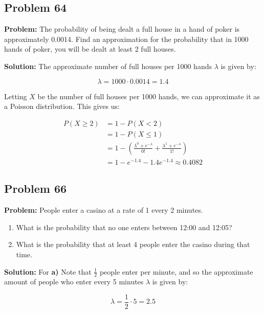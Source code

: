 \documentclass{article}
\begin{document}
\subsection*{Problem 64}
\noindent\textbf{Problem:} The probability of being dealt a full house in a hand of poker is approximately 0.0014. Find an approximation for the probability that in 1000 hands of poker, you will be dealt at least 2 full houses.
\bigskip

\noindent\textbf{Solution:} The approximate number of full houses per 1000 hands $\lambda$ is given by:

\begin{equation*}
    \lambda = 1000\cdot0.0014 = 1.4
\end{equation*}

Letting $X$ be the number of full houses per 1000 hands, we can approximate it as a Poisson distribution. This gives us:

\begin{align*}
    P(X\ge2)&=1-P(X<2)\tag{complement of inequality}\\
    &=1-P(X\le 1)\tag{discrete random variable}\\
    &=1-\left(\frac{\lambda^0+e^{-\lambda}}{0!}+\frac{\lambda^1+e^{-\lambda}}{1!}\right)\tag{Poisson distribution}\\
    &=1-e^{-1.4}-1.4e^{-1.4}\approx0.4082
\end{align*}

\subsection*{Problem 66}
\noindent\textbf{Problem:} People enter a casino at a rate of 1 every 2 minutes.
\begin{enumerate}[label=\textbf{\alph*)}]
    \item What is the probability that no one enters between 12:00 and 12:05?
    \item What is the probability that at least 4 people enter the casino during that time.
\end{enumerate}
\bigskip

\noindent\textbf{Solution:} For \textbf{a)} Note that $\frac{1}{2}$ people enter per minute, and so the approximate amount of people who enter every 5 minutes $\lambda$ is given by:

\begin{equation*}
    \lambda = \frac{1}{2}\cdot 5=2.5
\end{equation*}
\end{document}
